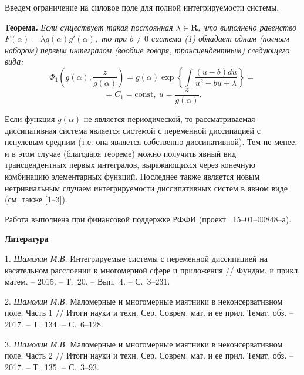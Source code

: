 Введем ограничение на силовое поле для полной интегрируемости
системы.

\textbf{Теорема.} {\it
Если существует такая постоянная
$\lambda\in\mathbf{R}$, что выполнено равенство
$
F(\alpha)=\lambda g(\alpha)g'(\alpha),
$
то при $b\ne 0$ система (1) обладает одним (полным набором) первым
интегралом (вообще говоря, трансцендентным) следующего вида:
$$
\Phi_1\left(g(\alpha),\frac{z}{g(\alpha)}\right)=g(\alpha)\exp\left\{\int\frac{(u-b)du}{u^2-bu+\lambda}\right\}=
$$
$$=C_1=\textrm{const},~u=\frac{z}{g(\alpha)}.$$
}

Если функция $g(\alpha)$ не является периодической, то
рассматриваемая диссипативная система является системой с переменной
диссипацией с ненулевым средним (т.е. она является собственно
диссипативной). Тем не менее, и в этом случае (благодаря теореме)
можно получить явный вид трансцендентных первых интегралов,
выражающихся через конечную комбинацию элементарных функций.
Последнее также является новым нетривиальным случаем интегрируемости
диссипативных систем в явном виде (см. также [1--3]).




Работа выполнена при финансовой поддержке РФФИ (проект
\No~15--01--00848--а).


\smallskip \centerline{\bf Литература}\nopagebreak


1. {\it Шамолин М.В.} Интегрируемые системы с переменной диссипацией
на касательном расслоении к многомерной сфере и приложения //
Фундам. и прикл. матем. -- 2015. -- Т.~20. -- Вып.~4. -- С.~3--231.

2. {\it Шамолин М.В.} Маломерные и многомерные маятники в
неконсервативном поле. Часть 1 // Итоги науки и техн. Сер. Соврем.
мат. и ее прил. Темат. обз. -- 2017. -- Т.~134. -- С.~6--128.

3. {\it Шамолин М.В.} Маломерные и многомерные маятники в
неконсервативном поле. Часть 2 // Итоги науки и техн. Сер. Соврем.
мат. и ее прил. Темат. обз. -- 2017. -- Т.~135. -- С.~3--93.








